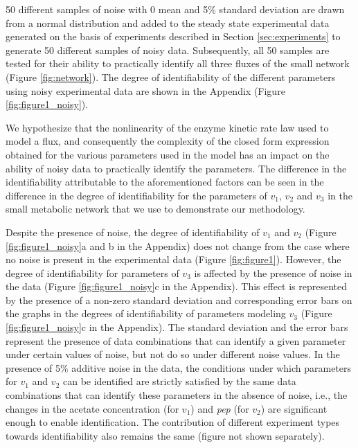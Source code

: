 \documentclass[10pt]{article}
\begin{document}
	50 different samples of noise with 0 mean and 5\% standard deviation are drawn from a normal distribution and added to the steady state experimental data generated on the basis of experiments described in Section \ref{sec:experiments} to generate 50 different samples of noisy data. Subsequently, all 50 samples are tested for their ability to practically identify all three fluxes of the small network (Figure \ref{fig:network}). The degree of identifiability of the different parameters using noisy experimental data are shown in the Appendix (Figure \ref{fig:figure1_noisy}). 
	
	We hypothesize that the nonlinearity of the enzyme kinetic rate law used to model a flux, and consequently the complexity of the closed form expression obtained for the various parameters used in the model has an impact on the ability of noisy data to practically identify the parameters. The difference in the identifiability attributable to the aforementioned factors can be seen in the difference in the degree of identifiability for the parameters of $v_1$, $v_2$ and $v_3$ in the small metabolic network that we use to demonstrate our methodology. 
	
	Despite the presence of noise, the degree of identifiability of $v_1$ and $v_2$ (Figure \ref{fig:figure1_noisy}a and b in the Appendix) does not change from the case where no noise is present in the experimental data (Figure \ref{fig:figure1}). However, the degree of identifiability for parameters of $v_3$ is affected by the presence of noise in the data (Figure \ref{fig:figure1_noisy}c in the Appendix). This effect is represented by the presence of a non-zero standard deviation and corresponding error bars on the graphs in the degrees of identifiability of parameters modeling $v_3$ (Figure \ref{fig:figure1_noisy}c in the Appendix). The standard deviation and the error bars represent the presence of data combinations that can identify a given parameter under certain values of noise, but not do so under different noise values. In the presence of 5\% additive noise in the data, the conditions under which parameters for $v_1$ and $v_2$ can be identified are strictly satisfied by the same data combinations that can identify these parameters in the absence of noise, i.e., the changes in the acetate concentration (for $v_1$) and \textit{pep} (for $v_2$) are significant enough to enable identification. The contribution of different experiment types towards identifiability also remains the same (figure not shown separately).
	
\end{document}
